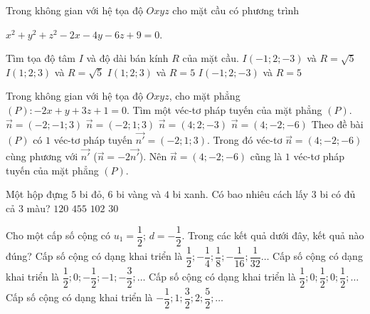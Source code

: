 \begin{ex}%
	Trong không gian với hệ tọa độ $Oxyz$ cho mặt cầu có phương trình
	\begin{center}
		$x^2+y^2+z^2-2x-4y-6z+9=0$.
	\end{center}
	Tìm tọa độ tâm $I$ và độ dài bán kính $R$ của mặt cầu.
	\choice
	{$I\left(-1;2;-3\right)$ và $R=\sqrt{5}$}
	{\True $I\left(1;2;3\right)$ và $R=\sqrt{5}$}
	{$I\left(1;2;3\right)$ và $R=5$}
	{$I\left(-1;2;-3\right)$ và $R=5$}
\end{ex}

\begin{ex}%
	Trong không gian với hệ tọa độ $ Oxyz $, cho mặt phẳng $(P):-2x+y+3z+1=0$. Tìm một véc-tơ pháp tuyến của mặt phẳng $(P)$.
	\choice
	{$\vec{n}=(-2;-1;3)$}
	{$\vec{n}=(-2;1;3)$}
	{$\vec{n}=(4;2;-3)$}
	{\True $\vec{n}=(4;-2;-6)$}
	\loigiai
	{Theo đề bài $(P)$ có $ 1 $ véc-tơ pháp tuyến $\vec{n'}=(-2;1;3)$. Trong đó véc-tơ $\vec{n}=(4;-2;-6)$ cùng phương với $\vec{n'}$ ($ \vec{n} = -2 \vec{n'} $). Nên $\vec{n}=(4;-2;-6)  $ cũng là $ 1 $ véc-tơ pháp tuyến của mặt phẳng $ (P) $.
	}
\end{ex}

\begin{ex}%
	Một hộp đựng $5$ bi đỏ, $ 6 $ bi vàng và $4$ bi xanh. Có bao nhiêu cách lấy $3$ bi có đủ cả $3$ màu?
	\choice
	{\True  $120 $}
	{$455$}
	{$102 $}
	{$30 $}
\end{ex}

\begin{ex}%
	Cho một cấp số cộng có $u_1 = \dfrac{1}{2}$; $d= -\dfrac{1}{2}$. Trong các kết quả dưới đây, kết quả nào đúng?
	\choice
	{Cấp số cộng có dạng khai triển là $\dfrac{1}{2};- \dfrac{1}{4}; \dfrac{1}{8}; -\dfrac{1}{16}; \dfrac{1}{32} \ldots $}
	{\True Cấp số cộng có dạng khai triển là $\dfrac{1}{2}; 0; -\dfrac{1}{2}; -1; -\dfrac{3}{2}; \ldots $}
	{Cấp số cộng có dạng khai triển là $\dfrac{1}{2}; 0; \dfrac{1}{2}; 0; \dfrac{1}{2}; \ldots $}
	{Cấp số cộng có dạng khai triển là $-\dfrac{1}{2}; 1; \dfrac{3}{2}; 2; \dfrac{5}{2}; \ldots $}
\end{ex} 

